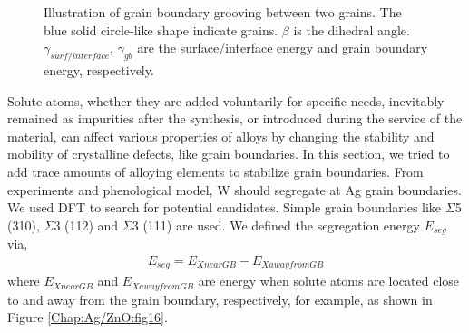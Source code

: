 \begingroup
\begin{figure}[!ht]
  \centering
  \caption[Illustration of grain boundary grooving effects.]{Illustration of grain boundary grooving between two grains. The blue solid circle-like shape indicate grains. $\beta$ is the dihedral angle. $\gamma_{surf/interface}$, $\gamma_{gb}$ are the surface/interface energy and grain boundary energy, respectively.}
  \label{Chap:Ag/ZnO:fig15}
\end{figure}
\endgroup


Solute atoms, whether they are added voluntarily for specific needs, inevitably remained as impurities after the synthesis, or introduced during the service of the material, can affect various properties of alloys by changing the stability and mobility of crystalline defects, like grain boundaries. In this section, we tried to add trace amounts of alloying elements to stabilize grain boundaries. From experiments and phenological model, W should segregate at Ag grain boundaries. \cite{chookajorn2012design,jiao2018nanocrystalline} We used \ac{DFT} to search for potential candidates. Simple grain boundaries like $\Sigma$5 (310), $\Sigma$3 (112) and $\Sigma$3 (111) are used. We defined the segregation energy $E_{seg}$ via,
\begin{align}
E_{seg} = E_{X near GB} - E_{X away from GB}
 \label{Chap:Ag/ZnO:eq:gb_seg}
\end{align}
where $E_{X near GB}$ and $E_{X away from GB}$ are energy when solute atoms are located close to and away from the grain boundary, respectively, for example, as shown in Figure \ref{Chap:Ag/ZnO:fig16}.



